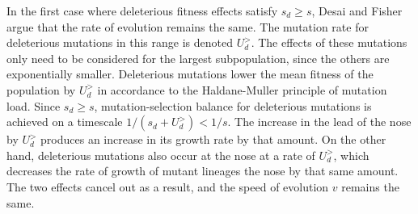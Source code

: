 \documentclass[12pt, one column]{article}
\begin{document}
In the first case where deleterious fitness effects satisfy $s_d \geq s$, Desai and Fisher argue that the rate of evolution remains the same.  The mutation rate for deleterious mutations in this range is denoted $U_d^{>}$.  The effects of these mutations only need to be considered for the largest subpopulation, since the others are exponentially smaller.  Deleterious mutations lower the mean fitness of the population by $U_d^{>}$ in accordance to the Haldane-Muller principle of mutation load.  Since $s_d \geq s$, mutation-selection balance for deleterious mutations is achieved on a timescale $1/(s_d +U_d^{>}) < 1/s$.  The increase in the lead of the nose by $U_d^{>}$ produces an increase in its growth rate by that amount.  On the other hand, deleterious mutations also occur at the nose at a rate of $U_d^{>}$, which decreases the rate of growth of mutant lineages the nose by that same amount.  The two effects cancel out as a result, and the speed of evolution $v$ remains the same.
\end{document}
